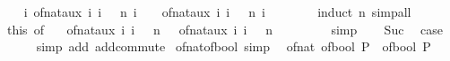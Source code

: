 \begin{isabellebody}
\ \ \isamarkupfalse%
\ {\isachardoublequoteopen}{\isasymAnd}i{\isachardot}{\kern0pt}\ of{\isacharunderscore}{\kern0pt}nat{\isacharunderscore}{\kern0pt}aux\ {\isacharparenleft}{\kern0pt}{\isasymlambda}i{\isachardot}{\kern0pt}\ i\ {\isacharplus}{\kern0pt}\ {}{\isacharparenright}{\kern0pt}\ n\ {\isacharparenleft}{\kern0pt}i\ {\isacharplus}{\kern0pt}\ {}{\isacharparenright}{\kern0pt}\ {\isacharequal}{\kern0pt}\ of{\isacharunderscore}{\kern0pt}nat{\isacharunderscore}{\kern0pt}aux\ {\isacharparenleft}{\kern0pt}{\isasymlambda}i{\isachardot}{\kern0pt}\ i\ {\isacharplus}{\kern0pt}\ {}{\isacharparenright}{\kern0pt}\ n\ i\ {\isacharplus}{\kern0pt}\ {}{\isachardoublequoteclose}\isanewline
\ \ \ \ \isamarkupfalse%
\ {\isacharparenleft}{\kern0pt}induct\ n{\isacharparenright}{\kern0pt}\ simp{\isacharunderscore}{\kern0pt}all\isanewline
\ \ \isamarkupfalse%
\ this\ {\isacharbrackleft}{\kern0pt}of\ {}{\isacharbrackright}{\kern0pt}\ \isamarkupfalse%
\ {\isachardoublequoteopen}of{\isacharunderscore}{\kern0pt}nat{\isacharunderscore}{\kern0pt}aux\ {\isacharparenleft}{\kern0pt}{\isasymlambda}i{\isachardot}{\kern0pt}\ i\ {\isacharplus}{\kern0pt}\ {}{\isacharparenright}{\kern0pt}\ n\ {}\ {\isacharequal}{\kern0pt}\ of{\isacharunderscore}{\kern0pt}nat{\isacharunderscore}{\kern0pt}aux\ {\isacharparenleft}{\kern0pt}{\isasymlambda}i{\isachardot}{\kern0pt}\ i\ {\isacharplus}{\kern0pt}\ {}{\isacharparenright}{\kern0pt}\ n\ {}\ {\isacharplus}{\kern0pt}\ {}{\isachardoublequoteclose}\isanewline
\ \ \ \ \isamarkupfalse%
\ simp\isanewline
\ \ \isamarkupfalse%
\ Suc\ \isamarkupfalse%
\ {\isacharquery}{\kern0pt}case\isanewline
\ \ \ \ \isamarkupfalse%
\ {\isacharparenleft}{\kern0pt}simp\ add{\isacharcolon}{\kern0pt}\ add{\isachardot}{\kern0pt}commute{\isacharparenright}{\kern0pt}\isanewline
{}\isamarkupfalse%
%
\endisatagproof
{\isafoldproof}%
%
\isadelimproof
\isanewline
%
\endisadelimproof
\isanewline
{}\isamarkupfalse%
\ of{\isacharunderscore}{\kern0pt}nat{\isacharunderscore}{\kern0pt}of{\isacharunderscore}{\kern0pt}bool\ {\isacharbrackleft}{\kern0pt}simp{\isacharbrackright}{\kern0pt}{\isacharcolon}{\kern0pt}\isanewline
\ \ {\isachardoublequoteopen}of{\isacharunderscore}{\kern0pt}nat\ {\isacharparenleft}{\kern0pt}of{\isacharunderscore}{\kern0pt}bool\ P{\isacharparenright}{\kern0pt}\ {\isacharequal}{\kern0pt}\ of{\isacharunderscore}{\kern0pt}bool\ P{\isachardoublequoteclose}\isanewline

\end{isabellebody}
